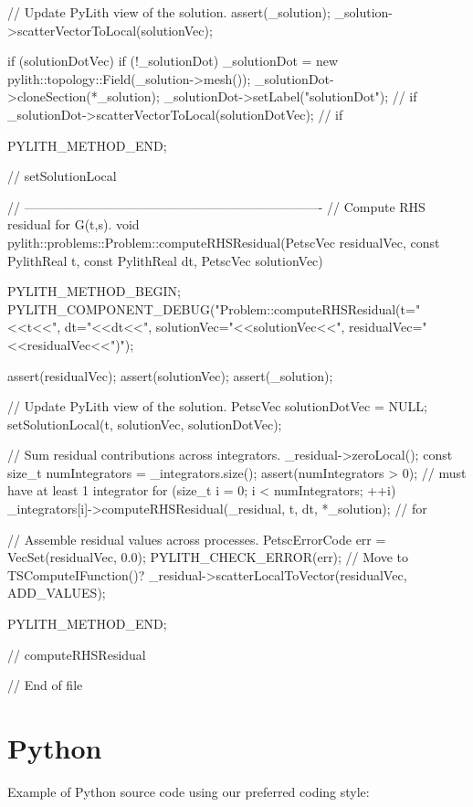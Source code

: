 \begin{cplusplus}
{    // Update PyLith view of the solution.
    assert(_solution);
    _solution->scatterVectorToLocal(solutionVec);

    if (solutionDotVec) {
        if (!_solutionDot) {
            _solutionDot = new pylith::topology::Field(_solution->mesh());
            _solutionDot->cloneSection(*_solution);
            _solutionDot->setLabel("solutionDot");
        } // if
        _solutionDot->scatterVectorToLocal(solutionDotVec);
    } // if

    PYLITH_METHOD_END;
} // setSolutionLocal

// ----------------------------------------------------------------------
// Compute RHS residual for G(t,s).
void
pylith::problems::Problem::computeRHSResidual(PetscVec residualVec,
                                              const PylithReal t,
                                              const PylithReal dt,
                                              PetscVec solutionVec) {
    PYLITH_METHOD_BEGIN;
    PYLITH_COMPONENT_DEBUG("Problem::computeRHSResidual(t="<<t<<", dt="<<dt<<", solutionVec="<<solutionVec<<", residualVec="<<residualVec<<")");

    assert(residualVec);
    assert(solutionVec);
    assert(_solution);

    // Update PyLith view of the solution.
    PetscVec solutionDotVec = NULL;
    setSolutionLocal(t, solutionVec, solutionDotVec);

    // Sum residual contributions across integrators.
    _residual->zeroLocal();
    const size_t numIntegrators = _integrators.size();
    assert(numIntegrators > 0); // must have at least 1 integrator
    for (size_t i = 0; i < numIntegrators; ++i) {
        _integrators[i]->computeRHSResidual(_residual, t, dt, *_solution);
    } // for

    // Assemble residual values across processes.
    PetscErrorCode err = VecSet(residualVec, 0.0); PYLITH_CHECK_ERROR(err); // Move to TSComputeIFunction()?
    _residual->scatterLocalToVector(residualVec, ADD_VALUES);

    PYLITH_METHOD_END;
} // computeRHSResidual

// End of file
  
\end{cplusplus}

\section{Python}

Example of Python source code using our preferred coding style:

